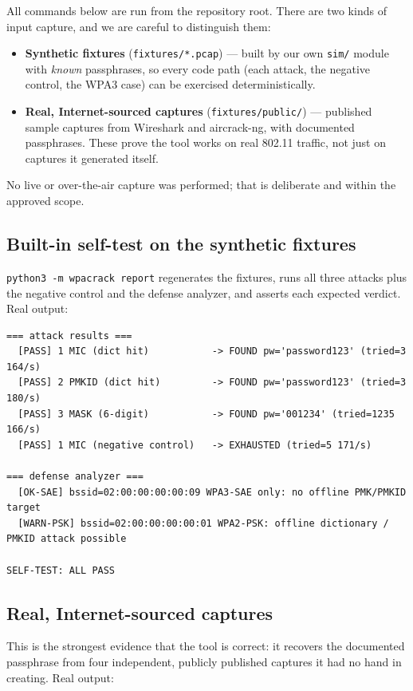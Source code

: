 \documentclass[11pt,a4paper]{article}
\newcommand{\code}[1]{\texttt{#1}}
\begin{document}
All commands below are run from the repository root. There are two kinds of input capture, and
we are careful to distinguish them:
\begin{itemize}
\item \textbf{Synthetic fixtures} (\code{fixtures/*.pcap}) --- built by our own \code{sim/}
      module with \emph{known} passphrases, so every code path (each attack, the negative
      control, the WPA3 case) can be exercised deterministically.
\item \textbf{Real, Internet-sourced captures} (\code{fixtures/public/}) --- published sample
      captures from Wireshark and aircrack-ng, with documented passphrases. These prove the
      tool works on real 802.11 traffic, not just on captures it generated itself.
\end{itemize}
No live or over-the-air capture was performed; that is deliberate and within the approved scope.

\subsection{Built-in self-test on the synthetic fixtures}

\code{python3 -m wpacrack report} regenerates the fixtures, runs all three attacks plus the
negative control and the defense analyzer, and asserts each expected verdict. Real output:

\begin{verbatim}
=== attack results ===
  [PASS] 1 MIC (dict hit)           -> FOUND pw='password123' (tried=3 164/s)
  [PASS] 2 PMKID (dict hit)         -> FOUND pw='password123' (tried=3 180/s)
  [PASS] 3 MASK (6-digit)           -> FOUND pw='001234' (tried=1235 166/s)
  [PASS] 1 MIC (negative control)   -> EXHAUSTED (tried=5 171/s)

=== defense analyzer ===
  [OK-SAE] bssid=02:00:00:00:00:09 WPA3-SAE only: no offline PMK/PMKID target
  [WARN-PSK] bssid=02:00:00:00:00:01 WPA2-PSK: offline dictionary / PMKID attack possible

SELF-TEST: ALL PASS
\end{verbatim}

\subsection{Real, Internet-sourced captures}
\label{sec:realcaps}

This is the strongest evidence that the tool is correct: it recovers the documented passphrase
from four independent, publicly published captures it had no hand in creating. Real output:
\end{document}

